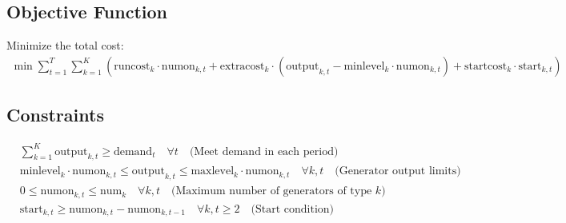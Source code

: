 \documentclass{article}
\begin{document}
\subsection*{Objective Function}
Minimize the total cost:
\begin{align*}
    \min \sum_{t=1}^{T} \sum_{k=1}^{K} \left( \text{runcost}_{k} \cdot \text{numon}_{k,t} + \text{extracost}_{k} \cdot (\text{output}_{k,t} - \text{minlevel}_{k} \cdot \text{numon}_{k,t}) + \text{startcost}_{k} \cdot \text{start}_{k,t} \right)
\end{align*}

\subsection*{Constraints}
\begin{align*}
    & \sum_{k=1}^{K} \text{output}_{k,t} \geq \text{demand}_{t} \quad \forall t \quad \text{(Meet demand in each period)} \\
    & \text{minlevel}_{k} \cdot \text{numon}_{k,t} \leq \text{output}_{k,t} \leq \text{maxlevel}_{k} \cdot \text{numon}_{k,t} \quad \forall k, t \quad \text{(Generator output limits)} \\
    & 0 \leq \text{numon}_{k,t} \leq \text{num}_{k} \quad \forall k, t \quad \text{(Maximum number of generators of type $k$)} \\
    & \text{start}_{k,t} \geq \text{numon}_{k,t} - \text{numon}_{k,t-1} \quad \forall k, t \geq 2 \quad \text{(Start condition)}
\end{align*}
\end{document}
